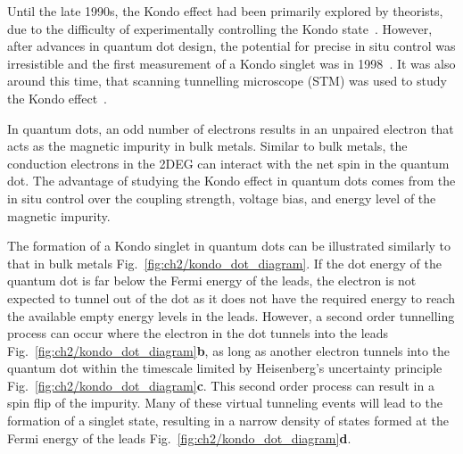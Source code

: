 Until the late 1990s, the Kondo effect had been primarily explored by theorists, due to the difficulty of experimentally controlling the Kondo state~\cite{kondo_review}. However, after advances in quantum dot design, the potential for precise in situ control was irresistible and the first measurement of a Kondo singlet was in 1998~\cite{goldhaber_first_kondo}. It was also around this time, that scanning tunnelling microscope (STM) was used to study the Kondo effect~\cite{stm_kondo}.

In quantum dots, an odd number of electrons results in an unpaired electron that acts as the magnetic impurity in bulk metals. Similar to bulk metals, the conduction electrons in the 2DEG can interact with the net spin in the quantum dot. The advantage of studying the Kondo effect in quantum dots comes from the in situ control over the coupling strength, voltage bias, and energy level of the magnetic impurity.

The formation of a Kondo singlet in quantum dots can be illustrated similarly to that in bulk metals Fig.~\ref{fig:ch2/kondo_dot_diagram}. 
If the dot energy of the quantum dot is far below the Fermi energy of the leads, the electron is not expected to tunnel out of the dot as it does not have the required energy to reach the available empty energy levels in the leads. However, a second order tunnelling process can occur where the electron in the dot tunnels into the leads Fig.~\ref{fig:ch2/kondo_dot_diagram}\textbf{b}, as long as another electron tunnels into the quantum dot within the timescale limited by Heisenberg’s uncertainty principle Fig.~\ref{fig:ch2/kondo_dot_diagram}\textbf{c}. This second order process can result in a spin flip of the impurity. Many of these virtual tunneling events will lead to the formation of a singlet state, resulting in a narrow density of states formed at the Fermi energy of the leads Fig.~\ref{fig:ch2/kondo_dot_diagram}\textbf{d}. 


